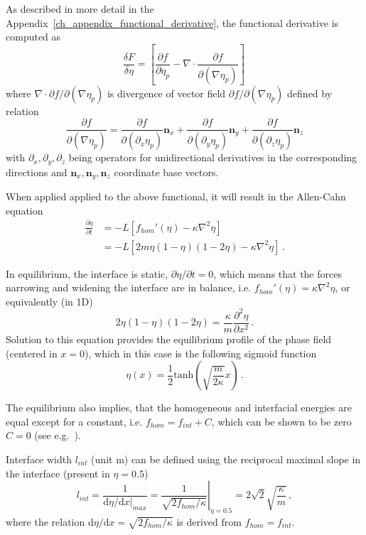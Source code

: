 As described in more detail in the Appendix~\ref{ch_appendix_functional_derivative}, the functional derivative is computed as
\begin{equation}
	\frac{\delta F}{\delta \eta} = \left[ \frac{\partial f}{\partial \eta_p} - \nabla\cdot\frac{\partial f}{\partial(\nabla \eta_p)} \right] \,
\end{equation}
where $\nabla\cdot\partial f/\partial(\nabla \eta_p)$ is divergence of vector field $\partial f/\partial(\nabla \eta_p)$ defined by relation
\begin{equation}
	\frac{\partial f}{\partial(\nabla \eta_p)} = \frac{\partial f}{\partial(\partial_x\eta_p)}\mathbf{n}_x + \frac{\partial f}{\partial(\partial_y \eta_p)}\mathbf{n}_y + \frac{\partial f}{\partial(\partial_z \eta_p)}\mathbf{n}_z
\end{equation}
with $\partial_x,\partial_y,\partial_z$ being operators for unidirectional derivatives in the corresponding directions and $\mathbf{n}_x,\mathbf{n}_y,\mathbf{n}_z$ coordinate base vectors. 

When applied applied to the above functional, it will result in the Allen-Cahn equation 
\begin{align}
	\frac{\partial \eta}{\partial t} &= -L[f_{hom}'(\eta) - \kappa\nabla^2\eta]\\
	 &=-L[2m\eta(1-\eta)(1-2\eta) - \kappa\nabla^2\eta] \,.
\end{align}

In equilibrium, the interface is static, $\partial \eta/\partial t = 0$, which means that the forces narrowing and widening the interface are in balance, i.e. $f_{hom}'(\eta) = \kappa\nabla^2\eta$, or equivalently (in 1D)
\begin{equation}
	2\eta(1-\eta)(1-2\eta) = \frac{\kappa}{m}\frac{\partial^2 \eta}{\partial x^2} \,.
\end{equation}
Solution to this equation provides the equilibrium profile of the phase field (centered in $x=0$), which in this case is the following sigmoid function
\begin{equation}
	\eta(x)=\frac{1}{2}\mathrm{tanh}\left(\sqrt{\frac{m}{2\kappa}}x\right) \,.
\end{equation}

The equilibrium also implies, that the homogeneous and interfacial energies are equal except for a constant, i.e. $f_{hom}=f_{int} + C$, which can be shown to be zero $C=0$ (see e.g.~\cite{Moelans2008}).

Interface width $l_{int}$ (unit \unit{\m}) can be defined using the reciprocal maximal slope in the interface (present in $\eta=0.5$)
\begin{equation}\label{eq_def_IW_fund_formula}
	l_{int} = \frac{1}{\mathrm{d}\eta/\mathrm{d}x|_{max}}=\left.\frac{1}{\sqrt{2 f_{hom}/\kappa}}\right|_{\eta=0.5} = 2\sqrt{2}\sqrt{\frac{\kappa}{m}} \,,
\end{equation}
where the relation $\mathrm{d}\eta/\mathrm{d}x=\sqrt{2 f_{hom}/\kappa}$ is derived from $f_{hom}=f_{int}$.

